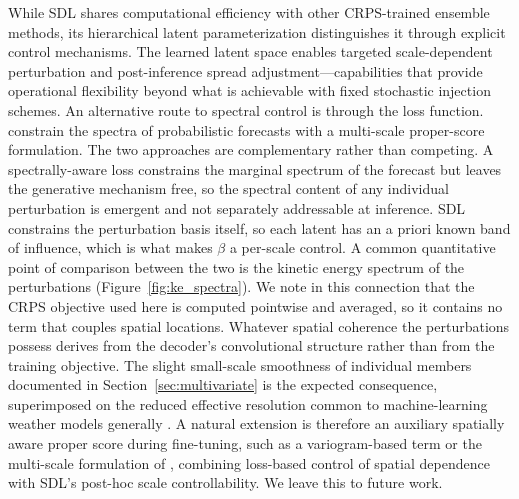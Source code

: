 \documentclass{agujournal2019}
\begin{document}
While SDL shares computational efficiency with other CRPS-trained ensemble methods, its hierarchical latent parameterization distinguishes it through explicit control mechanisms. The learned latent space enables targeted scale-dependent perturbation and post-inference spread adjustment—capabilities that provide operational flexibility beyond what is achievable with fixed stochastic injection schemes. An alternative route to spectral control is through the loss function.  constrain the spectra of probabilistic forecasts with a multi-scale proper-score formulation. The two approaches are complementary rather than competing. A spectrally-aware loss constrains the marginal spectrum of the forecast but leaves the generative mechanism free, so the spectral content of any individual perturbation is emergent and not separately addressable at inference. SDL constrains the perturbation basis itself, so each latent has an a priori known band of influence, which is what makes $\beta$ a per-scale control. A common quantitative point of comparison between the two is the kinetic energy spectrum of the perturbations (Figure~\ref{fig:ke_spectra}). We note in this connection that the CRPS objective used here is computed pointwise and averaged, so it contains no term that couples spatial locations. Whatever spatial coherence the perturbations possess derives from the decoder's convolutional structure rather than from the training objective. The slight small-scale smoothness of individual members documented in Section~\ref{sec:multivariate} is the expected consequence, superimposed on the reduced effective resolution common to machine-learning weather models generally \cite{bonavita2024limitations}. A natural extension is therefore an auxiliary spatially aware proper score during fine-tuning, such as a variogram-based term \cite{scheuerer2015variogram} or the multi-scale formulation of , combining loss-based control of spatial dependence with SDL's post-hoc scale controllability. We leave this to future work.

\end{document}
